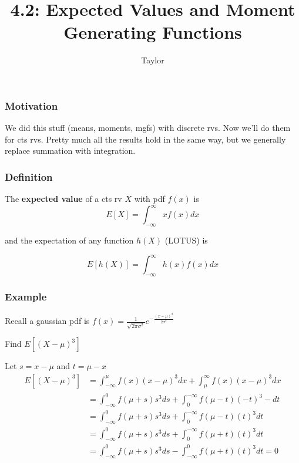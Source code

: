\documentclass{beamer}
\title["4.2"]{4.2: Expected Values and Moment Generating Functions}
\author{Taylor}
\institute[UVA] 
{
University of Virginia \\
\medskip
\textit{} 
}
\date{}
\begin{document}

\begin{frame}
\titlepage 
\end{frame}

\begin{frame}
\frametitle{Motivation}

We did this stuff (means, moments, mgfs) with discrete rvs. Now we'll do them for cts rvs. Pretty much all the results hold in the same way, but we generally replace summation with integration.

\end{frame}


\begin{frame}
\frametitle{Definition}

The \textbf{expected value} of a cts rv $X$ with pdf $f(x)$ is 
\[
E[X] = \int_{-\infty}^{\infty}x f(x) dx
\]

and the expectation of any function $h(X)$ (LOTUS) is 

\[
E[h(X)] = \int_{-\infty}^{\infty}h(x) f(x) dx
\]
\end{frame}



\begin{frame}
\frametitle{Example}

Recall a gaussian pdf is $f(x) = \frac{1}{\sqrt{2 \pi \sigma^2}} e^{- \frac{(x-\mu)^2}{2 \sigma^2}}$

Find $E[(X-\mu)^3]$
\newline
\pause

Let $s = x-\mu$ and $t = \mu - x$
\begin{align*}
E[(X-\mu)^3] &= \int_{-\infty}^{\mu}f(x)(x-\mu)^3dx + \int_{\mu}^{\infty}f(x)(x-\mu)^3dx \\
&= \int_{-\infty}^{0}f(\mu + s) s^3 ds + \int_{0}^{- \infty}f(\mu - t)(-t)^3 -dt \\
&= \int_{-\infty}^{0}f(\mu + s) s^3 ds + \int_{0}^{- \infty}f(\mu - t)(t)^3dt \\
&= \int_{-\infty}^{0}f(\mu + s) s^3 ds + \int_{0}^{- \infty}f(\mu + t)(t)^3dt \\
&= \int_{-\infty}^{0}f(\mu + s) s^3 ds -  \int_{- \infty}^0f(\mu + t)(t)^3dt = 0
\end{align*}
\end{frame}
\end{document}
